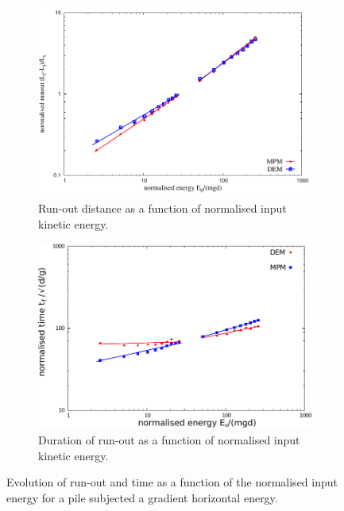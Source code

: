 \documentclass[3p,times,procedia,number]{elsarticle}
\begin{document}
\begin{figure}[tbph]
  \centering
  \begin{subfigure}[b]{0.49\textwidth}
    \centering
    \includegraphics[width=\textwidth]{figs/runout_eo_mpm_dem}
    \caption{Run-out distance as a function of normalised input kinetic energy.}
    \label{fig:runout_eo_mpm_dem}
  \end{subfigure}
  \begin{subfigure}[b]{0.49\textwidth}
    \centering
    \includegraphics[width=\textwidth]{figs/Tf_vs_Eo_Slope}
    \caption{Duration of run-out as a function of normalised input kinetic energy.}
    \label{fig:Tf_vs_Eo_Slope}
  \end{subfigure}
  \caption{Evolution of run-out and time as a function of the normalised input 
  energy for a pile subjected a gradient horizontal energy.}
  \label{fig:Slope}
\end{figure}
\end{document}
